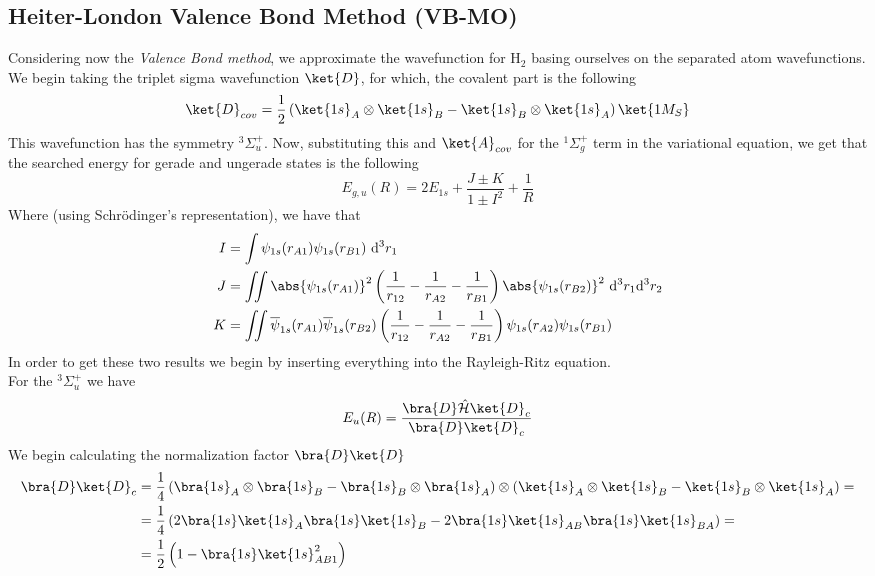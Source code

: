 \documentclass[a4paper, 11pt]{book}
\newcommand{\1}{\opr{\mathds{1}}}
\newcommand{\diff}[2][]{\ \mathrm{d}^{#1}#2}
\newcommand{\ddiff}[3][]{\ \mathrm{d}^{#1}#2\mathrm{d}^{#1}#3}
\newcommand{\ham}{\mathcal{H}}
\newcommand{\opr}[1]{\hat{#1}}
\newcommand{\cc}[1]{\overline{#1}}
\newcommand{\term}[3][]{^{#3}#2_{#1}}
\theoremstyle{plain}
\begin{document}
	\subsection{Heiter-London Valence Bond Method (VB-MO)}
	Considering now the \textit{Valence Bond method}, we approximate the wavefunction for $\mathrm{H}_2$ basing ourselves on the separated atom wavefunctions.\\
	We begin taking the triplet sigma wavefunction $\ket{D}$, for which, the covalent part is the following
	\begin{equation}
		\ket{D}_{cov}=\frac{1}{2}\left( \ket{1s}_A\otimes\ket{1s}_B-\ket{1s}_B\otimes\ket{1s}_A \right)\ket{1 M_S}
		\label{eq:covalentDwavefunction}
	\end{equation}
	This wavefunction has the symmetry $\term[u]{\Sigma^+}{3}$. Now, substituting this and $\ket{A}_{cov}$ for the $\term[g]{\Sigma^+}{1}$ term in the variational equation, we get that the searched energy for gerade and ungerade states is the following
	\begin{equation}
		E_{g,u}(R)=2E_{1s}+\frac{J\pm K}{1\pm I^2}+\frac{1}{R}
		\label{eq:geradeungeradeheiterlondon}
	\end{equation}
	Where (using Schrödinger's representation), we have that
	\begin{equation*}
		\begin{aligned}
			I&=\int\psi_{1s}(r_{A1})\psi_{1s}(r_{B1})\diff[3]{r_1}\\
			J&=\iint\abs{\psi_{1s}(r_{A1})}^2\left( \frac{1}{r_{12}}-\frac{1}{r_{A2}}-\frac{1}{r_{B1}} \right)\abs{\psi_{1s}(r_{B2})}^2\ddiff[3]{r_1}{r_2}\\
			K&=\iint\cc{\psi}_{1s}(r_{A1})\cc{\psi}_{1s}(r_{B2})\left( \frac{1}{r_{12}}-\frac{1}{r_{A2}}-\frac{1}{r_{B1}} \right)\psi_{1s}(r_{A2})\psi_{1s}(r_{B1})
		\end{aligned}
	\end{equation*}
	In order to get these two results we begin by inserting everything into the Rayleigh-Ritz equation.\\
	For the $\term[u]{\Sigma^+}{3}$ we have
	\begin{equation*}
		E_u(R)=\frac{\bra{D}\opr{\ham}\ket{D}_c}{\bra{D}\ket{D}_c}
	\end{equation*}
	We begin calculating the normalization factor $\bra{D}\ket{D}$
	\begin{equation*}
		\begin{aligned}
			\bra{D}\ket{D}_c&=\frac{1}{4}\left( \bra{1s}_A\otimes\bra{1s}_B-\bra{1s}_B\otimes\bra{1s}_A \right)\otimes\left( \ket{1s}_A\otimes\ket{1s}_B-\ket{1s}_B\otimes\ket{1s}_A \right)=\\
			&=\frac{1}{4}\left( 2\bra{1s}\ket{1s}_{A}\bra{1s}\ket{1s}_B-2\bra{1s}\ket{1s}_{AB}\bra{1s}\ket{1s}_{BA} \right)=\\
			&=\frac{1}{2}\left( 1-\bra{1s}\ket{1s}_{AB1}^2 \right)
		\end{aligned}
	\end{equation*}
\end{document}
